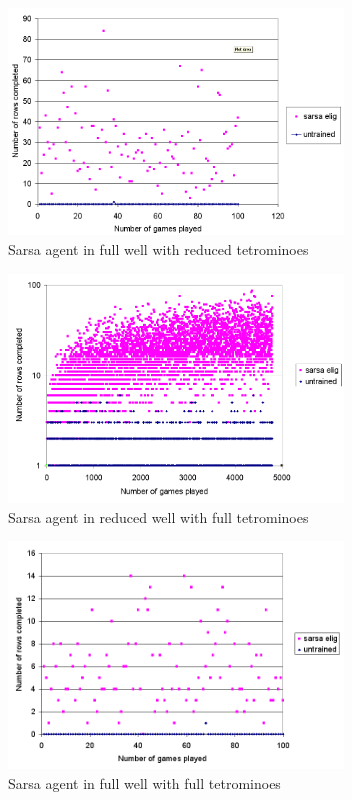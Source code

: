 \documentclass{rucsthesis}
\begin{document}
\begin{figure}[h]
\centering
\includegraphics[width=3.5in]{sarsaeligredtetfullwell.png}
\caption{Sarsa agent in full well with reduced tetrominoes}
\label{fig:sarsaeligredtetfullwell}
\end{figure}

\begin{figure}[h]
\centering
\includegraphics[width=3.5in]{sarsaeligfulltetredwell.png}
\caption{Sarsa agent in reduced well with full tetrominoes}
\label{fig:sarsaeligfulltetredwell}
\end{figure}

\begin{figure}[h]
\centering
\includegraphics[width=3.5in]{sarsaeligfulltetfullwell.png}
\caption{Sarsa agent in full well with full tetrominoes}
\label{fig:sarsaeligfulltetfullwell}
\end{figure}
\end{document}
